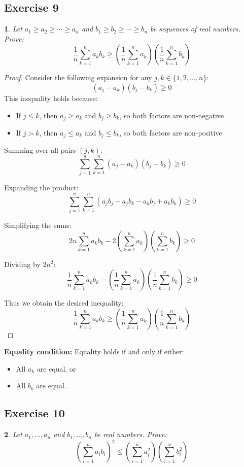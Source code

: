 \documentclass[12pt]{article}
\newtheorem{problem}{}
\begin{document}
\subsection*{Exercise 9}
\begin{problem}
Let \( a_1 \geq a_2 \geq \cdots \geq a_n \) and \( b_1 \geq b_2 \geq \cdots \geq b_n \) be sequences of real numbers. Prove:
\[
\frac{1}{n}\sum_{k=1}^n a_k b_k \geq \left(\frac{1}{n}\sum_{k=1}^n a_k\right)\left(\frac{1}{n}\sum_{k=1}^n b_k\right)
\]
\end{problem}

\begin{proof}
Consider the following expansion for any \( j,k \in \{1,2,\ldots,n\} \):
\[
(a_j - a_k)(b_j - b_k) \geq 0
\]
This inequality holds because:
\begin{itemize}
\item If \( j \leq k \), then \( a_j \geq a_k \) and \( b_j \geq b_k \), so both factors are non-negative
\item If \( j > k \), then \( a_j \leq a_k \) and \( b_j \leq b_k \), so both factors are non-positive
\end{itemize}

Summing over all pairs \( (j,k) \):
\[
\sum_{j=1}^n \sum_{k=1}^n (a_j - a_k)(b_j - b_k) \geq 0
\]

Expanding the product:
\[
\sum_{j=1}^n \sum_{k=1}^n (a_j b_j - a_j b_k - a_k b_j + a_k b_k) \geq 0
\]

Simplifying the sums:
\[
2n\sum_{k=1}^n a_k b_k - 2\left(\sum_{k=1}^n a_k\right)\left(\sum_{k=1}^n b_k\right) \geq 0
\]

Dividing by \( 2n^2 \):
\[
\frac{1}{n}\sum_{k=1}^n a_k b_k - \left(\frac{1}{n}\sum_{k=1}^n a_k\right)\left(\frac{1}{n}\sum_{k=1}^n b_k\right) \geq 0
\]

Thus we obtain the desired inequality:
\[
\frac{1}{n}\sum_{k=1}^n a_k b_k \geq \left(\frac{1}{n}\sum_{k=1}^n a_k\right)\left(\frac{1}{n}\sum_{k=1}^n b_k\right)
\]
\end{proof}

\textbf{Equality condition:} Equality holds if and only if either:
\begin{itemize}
\item All \( a_k \) are equal, or
\item All \( b_k \) are equal.
\end{itemize}

\subsection*{Exercise 10}
\begin{problem}
Let \( a_1, \ldots, a_n \) and \( b_1, \ldots, b_n \) be real numbers. Prove:
\[
\left( \sum_{i=1}^n a_i b_i \right)^2 \leq \left( \sum_{i=1}^n a_i^2 \right) \left( \sum_{i=1}^n b_i^2 \right)
\]
\end{problem}
\end{document}
